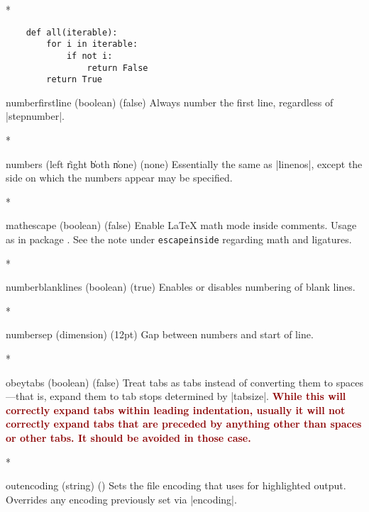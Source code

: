 \begin{paracol}{2}
\begin{optionlist}
    \switchcolumn[0]*%
\begin{example}
    \renewcommand{\theFancyVerbLine}{\sffamily
        \textcolor[rgb]{0.5,0.5,1.0}{\scriptsize
        \oldstylenums{\arabic{FancyVerbLine}}}}

    \begin{verbatim}
    def all(iterable):
        for i in iterable:
            if not i: 
                return False
        return True
    \end{verbatim}
\end{example}

\item[numberfirstline (boolean) (false)]
Always number the first line, regardless of |stepnumber|.
\switchcolumn

\switchcolumn[0]*%

  \item[numbers (left \| right \| both \| none) (none)]
    Essentially the same as |linenos|, except the side on which the numbers appear may be specified.
    \switchcolumn

\switchcolumn[0]*%
  \item[mathescape (boolean) (false)]
    Enable \LaTeX{} math mode inside comments.
    Usage as in package .
    See the note under \texttt{escapeinside} regarding math and ligatures.
    \switchcolumn

\switchcolumn[0]*%
  \item[numberblanklines (boolean) (true)]
    Enables or disables numbering of blank lines.
    \switchcolumn

\switchcolumn[0]*%
  \item[numbersep (dimension) (12pt)]
    Gap between numbers and start of line.
    \switchcolumn

\switchcolumn[0]*%
  \item[obeytabs (boolean) (false)]
    Treat tabs as tabs instead of converting them to spaces---that is, expand them to tab stops determined by |tabsize|.  \textcolor{DarkRed}{\textbf{While this will correctly expand tabs within leading indentation, usually it will not correctly expand tabs that are preceded by anything other than spaces or other tabs.  It should be avoided in those case.}}
    \switchcolumn

    \switchcolumn[0]*%
  \item[outencoding (string) (\meta{system-specific})]
    Sets the file encoding that  uses for highlighted output.  Overrides any encoding previously set via |encoding|.
    \switchcolumn


\end{optionlist}
\end{paracol}
